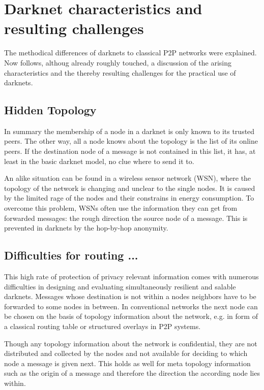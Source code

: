 \section{Darknet characteristics and resulting challenges}

The methodical differences of darknets to classical P2P networks were explained. Now follows, althoug already roughly touched, a discussion of the arising characteristics and the thereby resulting challenges for the practical use of darknets.

\subsection{Hidden Topology}

In summary the membership of a node in a darknet is only known to its trusted peers. The other way, all a node knows about the topology is the list of its online peers. If the destination node of a message is not contained in this list, it has, at least in the basic darknet model, no clue where to send it to.

An alike situation can be found in a wireless sensor network (WSN), where the topology of the network is changing and unclear to the single nodes. It is caused by the limited rage of the nodes and their constrains in energy consumption. To overcome this problem, WSNs often use the information they can get from forwarded messages: the rough direction the source node of a message. This is prevented in darknets by the hop-by-hop anonymity.


\subsection{Difficulties for routing ...}

This high rate of protection of privacy relevant information comes with numerous difficulties in designing and evaluating simultaneously resilient and salable darknets. Messages whose destination is not within a nodes neighbors have to be forwarded to some nodes in between. In conventional networks the next node can be chosen on the basis of topology information about the network, e.g. in form of a classical routing table or structured overlays in P2P systems.

Though any topology information about the network is confidential, they are not distributed and collected by the nodes and not available for deciding to which node a message is given next. This holds as well for meta topology information such as the origin of a message and therefore the direction the according node lies within.


